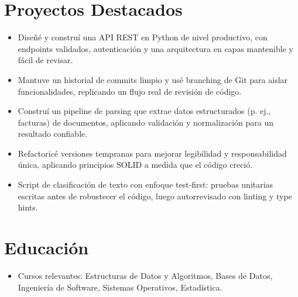 \documentclass[10pt]{article}
\begin{document}
\section{Proyectos Destacados}

\begin{itemize}
  \item Dise\~n\'e y constru\'i una API REST en Python de nivel productivo, con endpoints validados, autenticaci\'on y una arquitectura en capas mantenible y f\'acil de revisar.
  \item Mantuve un historial de commits limpio y us\'e branching de Git para aislar funcionalidades, replicando un flujo real de revisi\'on de c\'odigo.
\end{itemize}

\begin{itemize}
  \item Constru\'i un pipeline de parsing que extrae datos estructurados (p. ej., facturas) de documentos, aplicando validaci\'on y normalizaci\'on para un resultado confiable.
  \item Refactoric\'e versiones tempranas para mejorar legibilidad y responsabilidad \'unica, aplicando principios SOLID a medida que el c\'odigo creci\'o.
\end{itemize}

\begin{itemize}
  \item Script de clasificaci\'on de texto con enfoque test-first: pruebas unitarias escritas antes de robustecer el c\'odigo, luego autorrevisado con linting y type hints.
\end{itemize}

\section{Educaci\'on}
\begin{itemize}
  \item Cursos relevantes: Estructuras de Datos y Algoritmos, Bases de Datos, Ingenier\'ia de Software, Sistemas Operativos, Estad\'istica.
\end{itemize}
\end{document}
